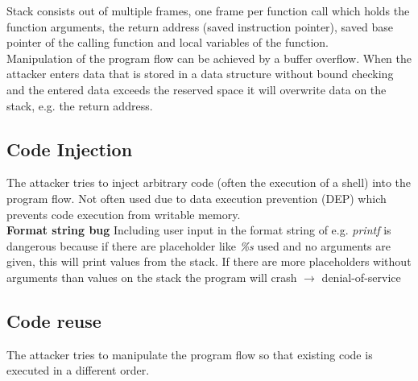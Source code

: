 \documentclass[12pt]{article}
\begin{document}
	Stack consists out of multiple frames, one frame per function call which holds the function arguments, the return address (saved instruction pointer), saved base pointer of the calling function and local variables of the function.\\
	Manipulation of the program flow can be achieved by a buffer overflow. When the attacker enters data that is stored in a data structure without bound checking and the entered data exceeds the reserved space it will overwrite data on the stack, e.g. the return address.
	
	\subsection{Code Injection}
	The attacker tries to inject arbitrary code (often the execution of a shell) into the program flow. Not often used due to data execution prevention (DEP) which prevents code execution from writable memory.\\
	\textbf{Format string bug} Including user input in the format string of e.g. \textit{printf} is dangerous because if there are placeholder like\textit{ \%s} used and no arguments are given, this will print values from the stack. If there are more placeholders without arguments than values on the stack the program will crash $\rightarrow$ denial-of-service
	
	
	\subsection{Code reuse} The attacker tries to manipulate the program flow so that existing code is executed in a different order.
	
	
\end{document}
